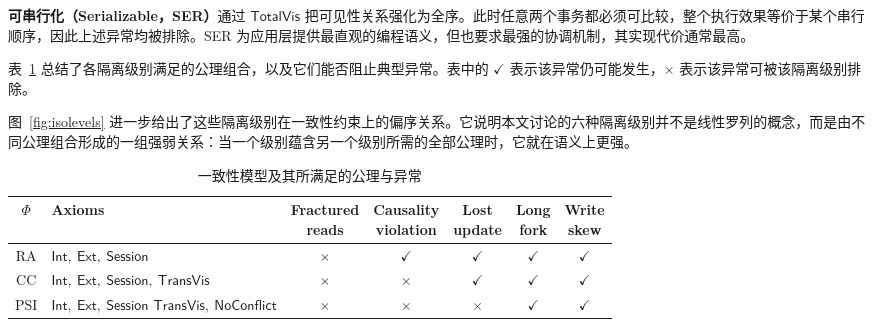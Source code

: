 \noindent\textbf{可串行化（Serializable，SER）}\cite{papadimitriou1979serializability}通过 $\mathsf{TotalVis}$ 把可见性关系强化为全序。此时任意两个事务都必须可比较，整个执行效果等价于某个串行顺序，因此上述异常均被排除。SER 为应用层提供最直观的编程语义，但也要求最强的协调机制，其实现代价通常最高。

表~\ref{tab:consistency-models} 总结了各隔离级别满足的公理组合，以及它们能否阻止典型异常。表中的 $\checkmark$ 表示该异常仍可能发生，$\times$ 表示该异常可被该隔离级别排除。

图~\ref{fig:isolevels} 进一步给出了这些隔离级别在一致性约束上的偏序关系。它说明本文讨论的六种隔离级别并不是线性罗列的概念，而是由不同公理组合形成的一组强弱关系：当一个级别蕴含另一个级别所需的全部公理时，它就在语义上更强。

\begin{table}[H]
    \centering
    \caption{一致性模型及其所满足的公理与异常}
    \label{tab:consistency-models}
    \small
    \setlength{\tabcolsep}{4pt} %
    \begin{tabular}{c l c c c c c}
        \hline
        $\Phi$ & Axioms                                                               & \makecell{Fractured                                              \\reads} & \makecell{Causality\\violation} & \makecell{Lost\\update} & \makecell{Long\\fork} & \makecell{Write\\skew} \\
        \hline
        RA     & $\mathsf{Int},\ \mathsf{Ext},\ \mathsf{Session}$
               & $\times$                                                             & $\checkmark$        & $\checkmark$ & $\checkmark$ & $\checkmark$ \\
        \midrule
        CC     & $\mathsf{Int},\ \mathsf{Ext},\ \mathsf{Session},\ \mathsf{TransVis}$
               & $\times$                                                             & $\times$            & $\checkmark$ & $\checkmark$ & $\checkmark$ \\
        \midrule
        PSI    & \makecell[l]{$\mathsf{Int},\ \mathsf{Ext},\ \mathsf{Session}$                                                                           \\$\mathsf{TransVis},\ \mathsf{NoConflict}$}
               & $\times$                                                             & $\times$            & $\times$     & $\checkmark$ & $\checkmark$ \\

\end{tabular}
\end{table}
